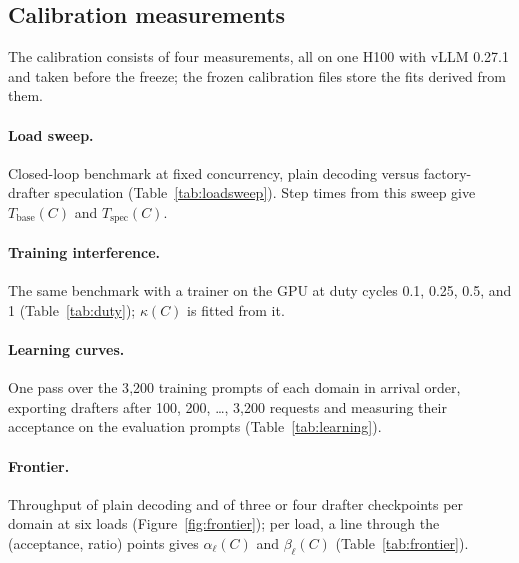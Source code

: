 \documentclass{article}
\begin{document}
\FloatBarrier
\subsection{Calibration measurements}

The calibration consists of four measurements, all on one H100 with vLLM 0.27.1 and taken before the freeze; the frozen calibration files store the fits derived from them.

\paragraph{Load sweep.} Closed-loop benchmark at fixed concurrency, plain decoding versus factory-drafter speculation (Table~\ref{tab:loadsweep}). Step times from this sweep give $T_{\mathrm{base}}(C)$ and $T_{\mathrm{spec}}(C)$.

\paragraph{Training interference.} The same benchmark with a trainer on the GPU at duty cycles 0.1, 0.25, 0.5, and 1 (Table~\ref{tab:duty}); $\kappa(C)$ is fitted from it.

\paragraph{Learning curves.} One pass over the 3{,}200 training prompts of each domain in arrival order, exporting drafters after 100, 200, \dots{}, 3{,}200 requests and measuring their acceptance on the evaluation prompts (Table~\ref{tab:learning}).

\paragraph{Frontier.} Throughput of plain decoding and of three or four drafter checkpoints per domain at six loads (Figure~\ref{fig:frontier}); per load, a line through the (acceptance, ratio) points gives $\alpha_\ell(C)$ and $\beta_\ell(C)$ (Table~\ref{tab:frontier}).
\end{document}

